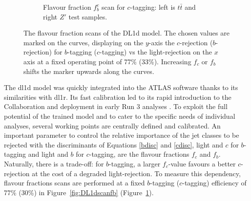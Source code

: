 \begin{figure}[h!]
\begin{subfigure}[b]{\textwidth}
    \caption{Flavour fraction $f_b^c$ scan for $c$-tagging: left is $t\bar{t}$ and right $Z'$ test samples.} 
    \label{fig:DL1dscanfc}
\end{subfigure}
  \caption{The flavour fraction scans of the DL1d model. The chosen values are marked on the curves, displaying on the $y$-axis the $c$-rejection ($b$-rejection) for $b$-tagging ($c$-tagging) vs the light-rejection on the $x$ axis at a fixed operating point of 77\% (33\%). Increasing $f_c$ or $f_b$ shifts the marker upwards along the curves. }
  \label{fig:DL1dscanf}
\end{figure} 

The \gls{dl1d} model was quickly integrated into the ATLAS software thanks to its similarities with \gls{dl1r}. Its fast calibration led to its rapid introduction to the Collaboration and deployment in early Run 3 analyses \cite{ATLAS-CONF-2022-070}. To exploit the full potential of the trained model and to cater to the specific needs of individual analyses, several working points are centrally defined and calibrated. An important parameter to control the relative importance of the jet classes to be rejected with the discriminants of Equations \ref{bdisc} and \ref{cdisc}, light and $c$ for $b$-tagging and light and $b$ for $c$-tagging, are the flavour fractions $f_c$ and $f_b$. Naturally, there is a trade-off: for $b$-tagging, a larger $f_c$-value favours a better $c$-rejection at the cost of a degraded light-rejection. To measure this dependency, flavour fractions scans are performed at a fixed $b$-tagging ($c$-tagging) efficiency of 77\% (30\%) in Figure~\ref{fig:DL1dscanfb} (Figure~\ref{fig:DL1dscanfc}). \\

